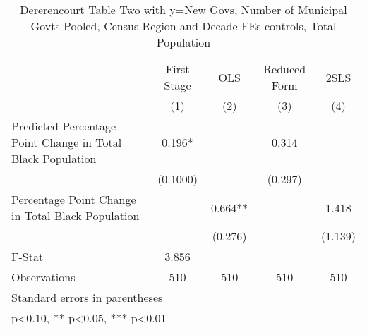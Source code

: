 \begin{table}[htbp]\centering
\def\sym#1{\ifmmode^{#1}\else\(^{#1}\)\fi}
\caption{Dererencourt Table Two with y=New Govs, Number of Municipal Govts  Pooled, Census Region and Decade FEs controls, Total Population}
\begin{tabular}{l*{4}{c}}
\toprule
                    & First Stage   &         OLS   &Reduced Form   &        2SLS   \\
                    &\multicolumn{1}{c}{(1)}   &\multicolumn{1}{c}{(2)}   &\multicolumn{1}{c}{(3)}   &\multicolumn{1}{c}{(4)}   \\
\midrule
Predicted Percentage Point Change in Total Black Population&       0.196*  &               &       0.314   &               \\
                    &    (0.1000)   &               &     (0.297)   &               \\
\addlinespace
Percentage Point Change in Total Black Population&               &       0.664** &               &       1.418   \\
                    &               &     (0.276)   &               &     (1.139)   \\
\midrule
F-Stat              &       3.856   &               &               &               \\
Observations        &         510   &         510   &         510   &         510   \\
\bottomrule
\multicolumn{5}{l}{\footnotesize Standard errors in parentheses}\\
\multicolumn{5}{l}{\footnotesize * p<0.10, ** p<0.05, *** p<0.01}\\
\end{tabular}
\end{table}
